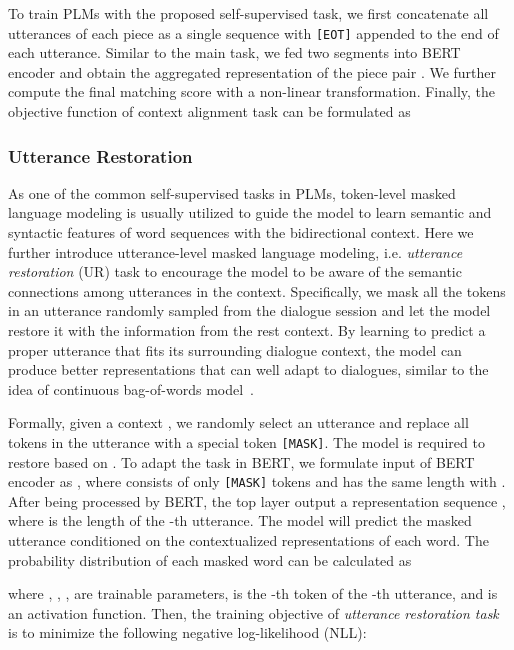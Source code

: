 \documentclass{article}
\begin{document}
To train PLMs with the proposed self-supervised task, we first concatenate all utterances of each piece as a single sequence with \texttt{[EOT]} appended to the end of each utterance. 
Similar to the main task, we fed two segments into BERT encoder and obtain the aggregated representation of the piece pair .
We further compute the final matching score  with a non-linear transformation.
Finally, the objective function of context alignment task can be formulated as


\subsubsection{Utterance Restoration}
As one of the common self-supervised tasks in PLMs, token-level masked language modeling is usually utilized to guide the model to learn semantic and syntactic features of word sequences with the bidirectional context.
Here we further introduce utterance-level masked language modeling, i.e. \emph{utterance restoration} (UR) task to encourage the model to be aware of the semantic connections among utterances in the context.
Specifically, we mask all the tokens in an utterance  randomly sampled from the dialogue session and let the model restore it with the information from the rest context.
By learning to predict a proper utterance that fits its surrounding dialogue context, the model can produce better representations that can well adapt to dialogues, similar to the idea of continuous bag-of-words model~\cite{mikolov2013efficient}.


Formally, given a context , we randomly select an utterance  and replace all tokens in the utterance with a special token \texttt{[MASK]}.
The model is required to restore  based on .
To adapt the task in BERT, we formulate input of BERT encoder as , where  consists of only \texttt{[MASK]} tokens and has the same length with .
After being processed by BERT, the top layer output a representation sequence , where  is the length of the -th utterance. The model will predict the masked utterance conditioned on the contextualized representations of each word. The probability distribution of each masked word can be calculated as

where , , ,  are trainable parameters,  is the -th token of the -th utterance, and  is an activation function.
Then, the training objective of \emph{utterance restoration task} is to minimize the following negative log-likelihood (NLL):
\end{document}
